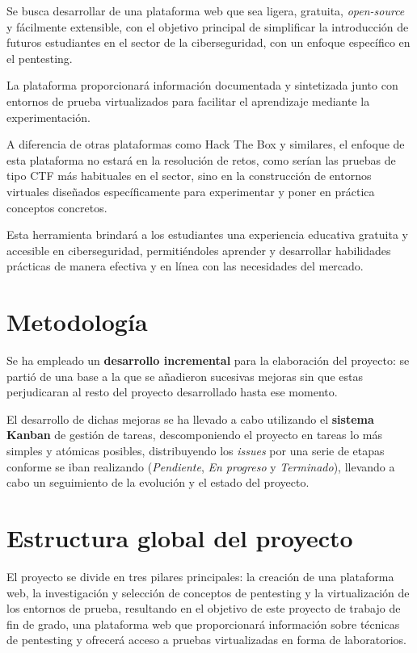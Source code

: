         Se busca desarrollar de una plataforma web que sea ligera, gratuita, \textit{open-source} y fácilmente extensible, con el objetivo principal de simplificar la introducción de futuros estudiantes en el sector de la ciberseguridad, con un enfoque específico en el pentesting.
        
        La plataforma proporcionará información documentada y sintetizada junto con entornos de prueba virtualizados para facilitar el aprendizaje mediante la experimentación.
        
        A diferencia de otras plataformas como Hack The Box y similares, el enfoque de esta plataforma no estará en la resolución de retos, como serían las pruebas de tipo CTF más habituales en el sector, sino en la construcción de entornos virtuales diseñados específicamente para experimentar y poner en práctica conceptos concretos.
        
        Esta herramienta brindará a los estudiantes una experiencia educativa gratuita y accesible en ciberseguridad, permitiéndoles aprender y desarrollar habilidades prácticas de manera efectiva y en línea con las necesidades del mercado.
    
    
    \section{Metodología}
    
        Se ha empleado un \textbf{desarrollo incremental} para la elaboración del proyecto: se partió de una base a la que se añadieron sucesivas mejoras sin que estas perjudicaran al resto del proyecto desarrollado hasta ese momento.
        
        El desarrollo de dichas mejoras se ha llevado a cabo utilizando el \textbf{sistema Kanban} de gestión de tareas, descomponiendo el proyecto en tareas lo más simples y atómicas posibles, distribuyendo los \textit{issues} por una serie de etapas conforme se iban realizando (\textit{Pendiente}, \textit{En progreso} y \textit{Terminado}), llevando a cabo un seguimiento de la evolución y el estado del proyecto.
        
        
        
        \newpage
    
    \section{Estructura global del proyecto}
        
        El proyecto se divide en tres pilares principales: la creación de una plataforma web, la investigación y selección de conceptos de pentesting y la virtualización de los entornos de prueba, resultando en el objetivo de este proyecto de trabajo de fin de grado, una plataforma web que proporcionará información sobre técnicas de pentesting y ofrecerá acceso a pruebas virtualizadas en forma de laboratorios. 
        

